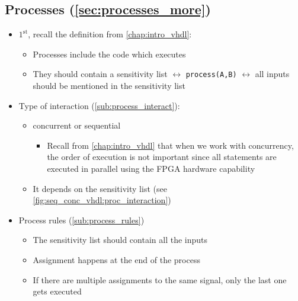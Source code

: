 \subsection{Processes (\ref{sec:processes_more})}


\begin{itemize}

\item $\mathrm{1}^\mathrm{st}$, recall the definition from \autoref{chap:intro_vhdl}:

	\begin{itemize}
	\item Processes include the code which executes 
	
	\item They should contain a sensitivity list $\leftrightarrow$ \verb|process(A,B)| $\leftrightarrow$ all inputs should be mentioned in the sensitivity list
	\end{itemize}

\item Type of interaction (\ref{sub:process_interact}): 

	\begin{itemize}
	\item concurrent or sequential
	
		\begin{itemize}
		\item Recall from \autoref{chap:intro_vhdl} that when we work with concurrency, the order of execution is not important since all statements are executed in parallel using the FPGA hardware capability
		\end{itemize}
	
	\item It depends on the sensitivity list (see \autoref{fig:seq_conc_vhdl:proc_interaction})
	\end{itemize}


\item Process rules (\ref{sub:process_rules})

	\begin{itemize}
	\item The sensitivity list should contain all the inputs
	
	\item Assignment happens at the end of the process
	
	\item If there are multiple assignments to the same signal, only the last one gets executed
	\end{itemize}

\end{itemize}

